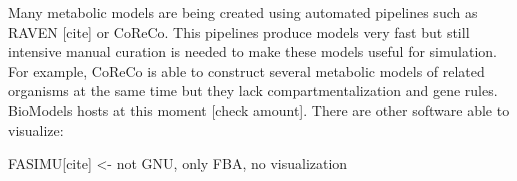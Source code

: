 Many metabolic models are being created using automated pipelines such as RAVEN [cite] or CoReCo. This pipelines produce models very fast but still intensive manual curation is needed to make these models useful for simulation. For example, CoReCo is able to construct several metabolic models of related organisms at the same time but they lack compartmentalization and gene rules. BioModels hosts at this moment [check amount]. There are other software able to visualize:

FASIMU[cite] <- not GNU, only FBA, no visualization

